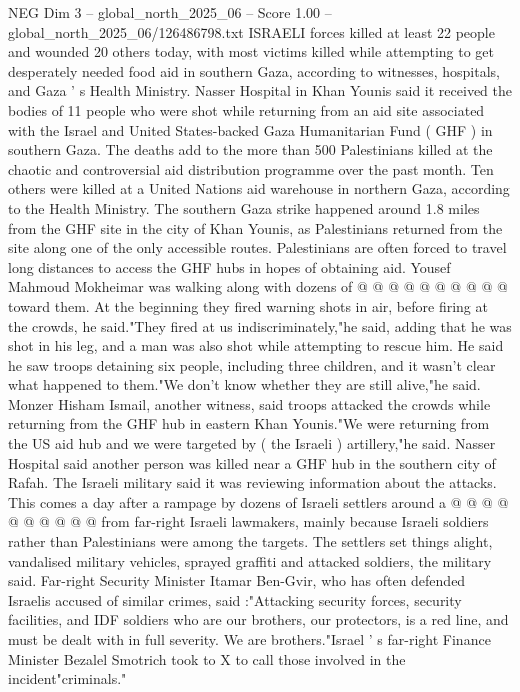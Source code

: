 \begin{textsample}{NEG Dim 3 – global\_north\_2025\_06 – Score 1.00 – global\_north\_2025\_06/126486798.txt}  \label{ex:f3_neg_359}
ISRAELI forces killed at least 22 people and wounded 20 others today, with most victims killed while attempting to get desperately needed food aid in southern Gaza, according to witnesses, hospitals, and Gaza ' s Health Ministry.
Nasser Hospital in Khan Younis said it received the bodies of 11 people who were shot while returning from an aid site associated with the Israel and United States-backed Gaza Humanitarian Fund ( GHF ) in southern Gaza.
The deaths add to the more than 500 Palestinians killed at the chaotic and controversial aid distribution programme over the past month.
Ten others were killed at a United Nations aid warehouse in northern Gaza, according to the Health Ministry.
The southern Gaza strike happened around 1.8 miles from the GHF site in the city of Khan Younis, as Palestinians returned from the site along one of the only accessible routes.
Palestinians are often forced to travel long distances to access the GHF hubs in hopes of obtaining aid.
Yousef Mahmoud Mokheimar was walking along with dozens of @ @ @ @ @ @ @ @ @ @ toward them.
At the beginning they fired warning shots in air, before firing at the crowds, he said."They fired at us indiscriminately,"he said, adding that he was shot in his leg, and a man was also shot while attempting to rescue him.
He said he saw troops detaining six people, including three children, and it wasn't clear what happened to them."We don't know whether they are still alive,"he said.
Monzer Hisham Ismail, another witness, said troops attacked the crowds while returning from the GHF hub in eastern Khan Younis."We were returning from the US aid hub and we were targeted by ( the Israeli ) artillery,"he said.
Nasser Hospital said another person was killed near a GHF hub in the southern city of Rafah.
The Israeli military said it was reviewing information about the attacks.
This comes a day after a rampage by dozens of Israeli settlers around a @ @ @ @ @ @ @ @ @ @ from far-right Israeli lawmakers, mainly because Israeli soldiers rather than Palestinians were among the targets.
The settlers set things alight, vandalised military vehicles, sprayed graffiti and attacked soldiers, the military said.
Far-right Security Minister Itamar Ben-Gvir, who has often defended Israelis accused of similar crimes, said :"Attacking security forces, security facilities, and IDF soldiers who are our brothers, our protectors, is a red line, and must be dealt with in full severity.
We are brothers."Israel ' s far-right Finance Minister Bezalel Smotrich took to X to call those involved in the incident"criminals."

\end{textsample}
